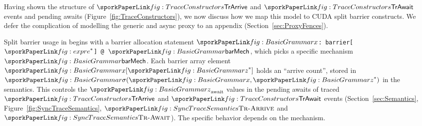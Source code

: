 
Having shown the structure of $\sporkTrArrive$ and $\sporkTrAwait$ events and pending awaits
(Figure~\ref{fig:TraceConstructors}),
we now discuss how we map this model to CUDA split barrier constructs.
We defer the complication of modelling the generic and async proxy
\cite{ptx} \cite{LustigMixedProxy} to an appendix (Section~\ref{sec:ProxyFences}).

Split barrier usage in \sporkName{} begins with a barrier allocation statement
\texttt{$\sporkx$: barrier[$\sporkexpr^*$] @ $\sporkbarMech$},
which picks a specific mechanism $\sporkbarMech$.
Each barrier array element $\sporkx[\sporkz^*]$ holds an ``arrive count'',
stored in $\sporksigma(\sporkx, \sporkz^*)$ in the semantics.
This controls the $\sporkz_\mathrm{await}$ values in the pending awaits
of traced $\sporkTrArrive$ and $\sporkTrAwait$ events
(Section~\ref{sec:Semantics}, Figure~\ref{fig:SyncTraceSemantics}, $\sporkTrArriveRule$ and $\sporkTrAwaitRule$).
The specific behavior depends on the mechanism.



